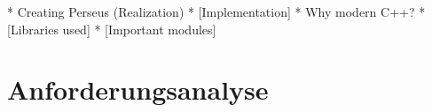 
*   Creating Perseus (Realization)
    *   [Implementation]
        *   Why modern C++?
        *   [Libraries used]
        *   [Important modules]



\chapter{Anforderungsanalyse}







